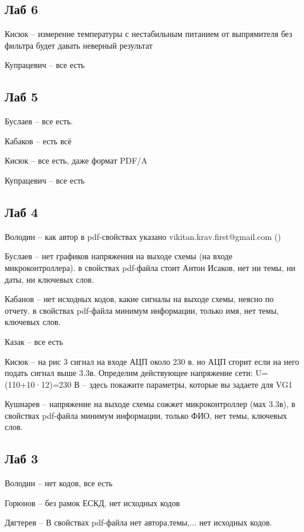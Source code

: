 \documentclass[a4paper,11pt]{article}
\begin{document}
\newpage
{}
\recalctypearea

\subsection*{Лаб 6}
Кисюк -- измерение температуры с нестабильным питанием от выпрямителя без фильтра будет давать неверный результат

Купрацевич -- все есть

\subsection*{Лаб 5}
Буслаев -- все есть.

Кабаков -- есть всё

Кисюк -- все есть, даже формат PDF/A

Купрацевич -- все есть
\subsection*{Лаб 4}

Володин --  как автор в pdf-свойствах указано vikitan.krav.first@gmail.com ()

Буслаев -- нет графиков напряжения на выходе схемы (на входе микроконтроллера). в свойствах pdf-файла стоит Антон Исаков,
нет ни темы, ни даты, ни ключевых слов.

Кабанов -- нет исходных кодов, какие сигналы на выходе схемы, неясно по отчету.  в свойствах pdf-файла минимум информации,
только имя, нет темы, ключевых слов.

Казак -- все есть

Кисюк -- на рис 3 сигнал на входе АЦП около 230 в. но АЦП сгорит если на него подать сигнал выше 3.3в.  Определим действующее напряжение сети:
U=(110+10·12)=230 В  -- здесь покажите параметры, которые вы задаете для VG1

Кушнарев -- напряжение на выходе схемы сожжет микроконтроллер (мах 3.3в), в свойствах pdf-файла минимум информации,
только ФИО, нет темы, ключевых слов.


\subsection*{Лаб 3}

Володин -- нет кодов, все есть

Горюнов -- без рамок ЕСКД, нет исходных кодов

Дягтерев --  В свойствах pdf-файла нет автора,темы,... нет исходных кодов.
\end{document}
